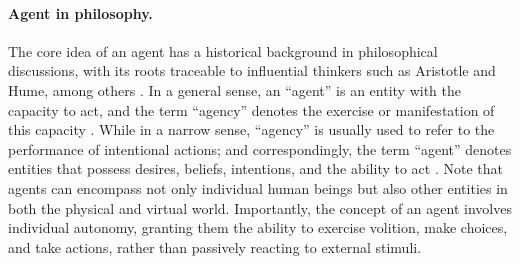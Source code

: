 \documentclass{article}
\begin{document}
\paragraph{Agent in philosophy.}
The core idea of an agent has a historical background in philosophical discussions, with its roots traceable to influential thinkers such as Aristotle and Hume, among others \cite{sep-agency}.  
In a general sense, an ``agent'' is an entity with the capacity to act, and the term ``agency'' denotes the exercise or manifestation of this capacity \cite{sep-agency}.
While in a narrow sense, ``agency'' is usually used to refer to the performance of intentional actions; and correspondingly, the term ``agent'' denotes entities that possess desires, beliefs, intentions, and the ability to act \cite{anscombe2000intention,60a9dd9a-e48a-3fcf-87dd-d5c158406fc6,Davidson1971-DAVIA-2,dennett1988precis}. 
Note that agents can encompass not only individual human beings but also other entities in both the physical and virtual world.
Importantly, the concept of an agent involves individual autonomy, granting them the ability to exercise volition, make choices, and take actions, rather than passively reacting to external stimuli.



\end{document}
